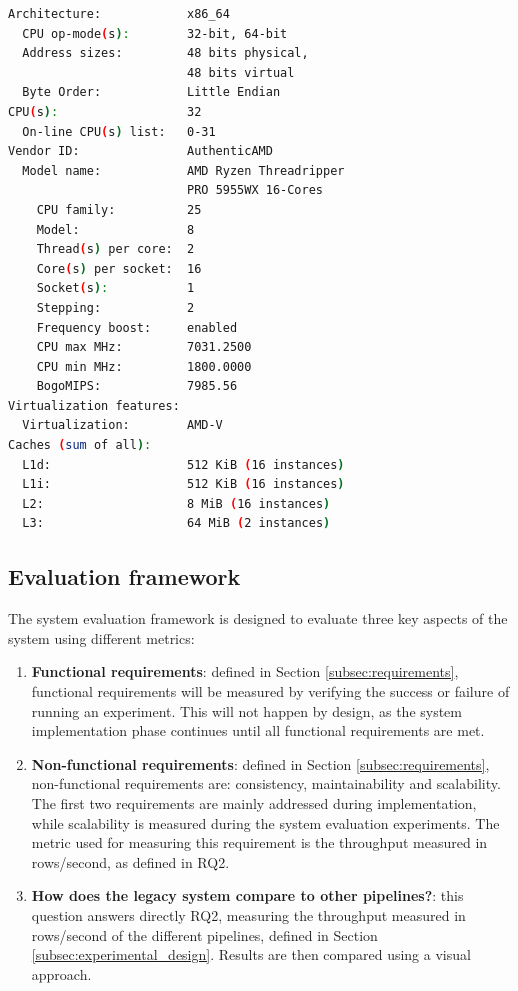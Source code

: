 \begin{lstlisting}[language=bash, caption={[Experimental environment details]Output of a \textit{lscpu} bash command in the experimental environment.}, label={lst:cpu_snurran}, frame=tb]
Architecture:            x86_64
  CPU op-mode(s):        32-bit, 64-bit
  Address sizes:         48 bits physical, 
                         48 bits virtual
  Byte Order:            Little Endian
CPU(s):                  32
  On-line CPU(s) list:   0-31
Vendor ID:               AuthenticAMD
  Model name:            AMD Ryzen Threadripper 
                         PRO 5955WX 16-Cores
    CPU family:          25
    Model:               8
    Thread(s) per core:  2
    Core(s) per socket:  16
    Socket(s):           1
    Stepping:            2
    Frequency boost:     enabled
    CPU max MHz:         7031.2500
    CPU min MHz:         1800.0000
    BogoMIPS:            7985.56
Virtualization features: 
  Virtualization:        AMD-V
Caches (sum of all):     
  L1d:                   512 KiB (16 instances)
  L1i:                   512 KiB (16 instances)
  L2:                    8 MiB (16 instances)
  L3:                    64 MiB (2 instances)
\end{lstlisting}

\subsection{Evaluation framework}
%

The system evaluation framework is designed to evaluate three key aspects of the system using different metrics:
\begin{enumerate}
    \item \textbf{Functional requirements}: defined in Section \ref{subsec:requirements}, functional requirements will be measured by verifying the success or failure of running an experiment. This will not happen by design, as the system implementation phase continues until all functional requirements are met.
    \item \textbf{Non-functional requirements}: defined in Section \ref{subsec:requirements}, non-functional requirements are: consistency, maintainability and scalability. The first two requirements are mainly addressed during implementation, while scalability is measured during the system evaluation experiments. The metric used for measuring this requirement is the throughput measured in rows/second, as defined in RQ2.
    \item \textbf{How does the legacy system compare to other pipelines?}: this question answers directly RQ2, measuring the throughput measured in rows/second of the different pipelines, defined in Section \ref{subsec:experimental_design}. Results are then compared using a visual approach.
\end{enumerate} 

